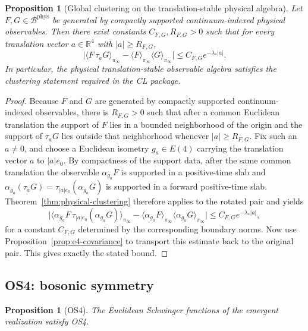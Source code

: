 \documentclass[11pt]{article}
\newtheorem{proposition}[theorem]{Proposition}
\theoremstyle{definition}
\theoremstyle{remark}
\newcommand{\R}{\mathbb R}
\newcommand{\mcB}{\mathcal B}
\begin{document}
\begin{proposition}[Global clustering on the translation-stable physical algebra]
\label{prop:global-clustering}
Let \(F,G\in\mcB^{\mathrm{phys}}\) be generated by compactly supported
continuum-indexed physical observables.  Then there exist constants
\(C_{F,G},R_{F,G}>0\) such that for every translation vector
\(a\in\R^4\) with \(|a|\ge R_{F,G}\),
\[
\bigl|
\langle F\,\tau_a G\rangle_{\pi_\infty}
-\langle F\rangle_{\pi_\infty}\langle G\rangle_{\pi_\infty}
\bigr|
\le
C_{F,G}e^{-\lambda_*|a|}.
\]
In particular, the physical translation-stable observable algebra satisfies the
clustering statement required in the CL package.
\end{proposition}

\begin{proof}
Because \(F\) and \(G\) are generated by compactly supported continuum-indexed
observables, there is \(R_{F,G}>0\) such that after a common Euclidean
translation the support of \(F\) lies in a bounded neighborhood of the origin
and the support of \(\tau_a G\) lies outside that neighborhood whenever
\(|a|\ge R_{F,G}\).  Fix such an \(a\neq0\), and choose a Euclidean isometry
\(g_a\in E(4)\) carrying the translation vector \(a\) to \(|a|e_0\).
By compactness of the support data, after the same common translation the
observable \(\alpha_{g_a}F\) is supported in a positive-time slab and
\(\alpha_{g_a}(\tau_aG)=\tau_{|a|e_0}(\alpha_{g_a}G)\) is supported in a
forward positive-time slab.  Theorem~\ref{thm:physical-clustering} therefore
applies to the rotated pair and yields
\[
\bigl|
\langle \alpha_{g_a}F\,\tau_{|a|e_0}(\alpha_{g_a}G)\rangle_{\pi_\infty}
-\langle \alpha_{g_a}F\rangle_{\pi_\infty}
\langle \alpha_{g_a}G\rangle_{\pi_\infty}
\bigr|
\le
C_{F,G}e^{-\lambda_*|a|},
\]
for a constant \(C_{F,G}\) determined by the corresponding boundary norms.
Now use Proposition~\ref{prop:e4-covariance} to transport this estimate back to
the original pair.  This gives exactly the stated bound.
\end{proof}

\subsection{OS4: bosonic symmetry}

\begin{proposition}[OS4]
\label{prop:os4}
The Euclidean Schwinger functions of the emergent realization satisfy OS4.
\end{proposition}
\end{document}
